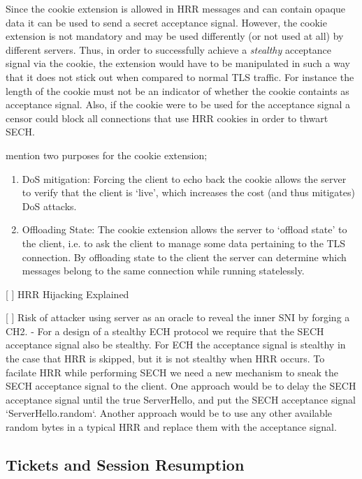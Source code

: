 Since the cookie extension is allowed in HRR messages and can contain opaque data it can be used to send a secret acceptance signal. However, the cookie extension is not mandatory and may be used differently (or not used at all) by different servers. Thus, in order to successfully achieve a {\em stealthy} acceptance signal via the cookie, the extension would have to be manipulated in such a way that it does not stick out  when compared to normal TLS traffic. For instance the length of the cookie must not be an indicator of whether the cookie containts as acceptance signal. Also, if the cookie were to be used for the acceptance signal a censor could block all connections that use HRR cookies in order to thwart SECH.

 mention two purposes for the cookie extension;
\begin{enumerate}
    \item DoS mitigation: Forcing the client to echo back the cookie allows the server to verify that the client is `live', which increases the cost (and thus mitigates) DoS attacks.
    \item Offloading State: The cookie extension allows the server to `offload state' to the client, i.e. to ask the client to manage some data pertaining to the TLS connection. By offloading state to the client the server can determine which messages belong to the same connection while running statelessly.
\end{enumerate}

[ ] HRR Hijacking Explained

[ ] Risk of attacker using server as an oracle to reveal the inner SNI by forging a CH2.
        - For a design of a stealthy ECH protocol we require that the SECH acceptance signal also be stealthy. For ECH the acceptance signal is stealthy in the case that HRR is skipped, but it is not stealthy when HRR occurs. To facilate HRR while performing SECH we need a new mechanism to sneak the SECH acceptance signal to the client. One approach would be to delay the SECH acceptance signal until the true ServerHello, and put the SECH acceptance signal `ServerHello.random`. Another approach would be to use any other available random bytes in a typical HRR and replace them with the acceptance signal.

\subsection{Tickets and Session Resumption}

